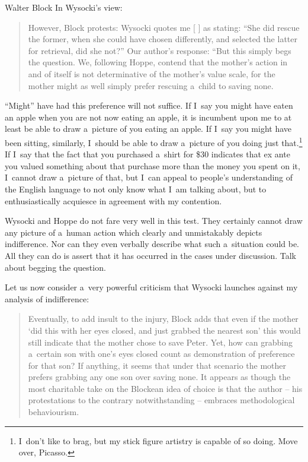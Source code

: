 \begin{artengenv}{Walter Block}
In Wysocki's view:



\begin{quote}
However, Block 
\parencite*[][pp.50–51]{block_response_2022} %
 protests: Wysocki quotes me [%
\parencite[][pp.50–51]{block_response_2022}%
] as stating: ``She did rescue the former, when she could have chosen differently, and selected the latter for retrieval, did she not?'' Our author's response: ``But this simply begs the question. We, following Hoppe, contend that the mother's action in and of itself is not determinative of the mother's value scale, for the mother might as well simply prefer rescuing a~child to saving none.
\end{quote}


``Might'' have had this preference will not suffice. If I~say you might have eaten an apple when you are not now eating an apple, it is incumbent upon me to at least be able to draw a~picture of you eating an apple. If I~say you might have been sitting, similarly, I~should be able to draw a~picture of you doing just that.\footnote{I~don't like to brag, but my stick figure artistry is capable of so doing. Move over, Picasso.} If I~say that the fact that you purchased a~shirt for \$30 indicates that ex ante you valued something about that purchase more than the money you spent on it, I~cannot draw a~picture of that, but I~can appeal to people's understanding of the English language to not only know what I~am talking about, but to enthusiastically acquiesce in agreement with my contention.



Wysocki and Hoppe do not fare very well in this test. They certainly cannot draw any picture of a~human action which clearly and unmistakably depicts indifference. Nor can they even verbally describe what such a~situation could be. All they can do is assert that it has occurred in the cases under discussion. Talk about begging the question.



Let us now consider a~very powerful criticism that Wysocki launches against my analysis of indifference:



\begin{quote}
Eventually, to add insult to the injury, Block 
\parencite*[][p.51]{block_response_2022} %
 adds that even if the mother ‘did this with her eyes closed, and just grabbed the nearest son' this would still indicate that the mother chose to save Peter. Yet, how can grabbing a~certain son with one's eyes closed count as demonstration of preference for that son? If anything, it seems that under that scenario the mother prefers grabbing any one son over saving none. It appears as though the most charitable take on the Blockean idea of choice is that the author -- his protestations to the contrary notwithstanding -- embraces methodological behaviourism.
\end{quote}




\end{artengenv}
